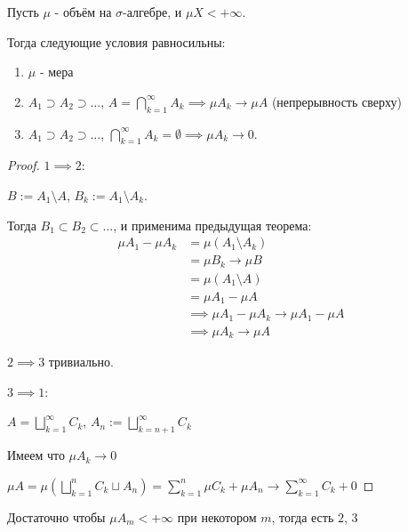 \begin{theorem} \thmslashn

    Пусть $\mu$ - объём на $\sigma$-алгебре, и $\mu X < +\infty$.

    Тогда следующие условия равносильны:
    \begin{enumerate}
        \item $\mu$ - мера
        \item $A_1 \supset A_2 \supset \ldots$, $A = \bigcap\limits_{k=1}^{\infty} A_{k} \implies \mu A_{k} \to \mu A $ (непрерывность сверху)
        \item $A_1 \supset A_2 \supset \ldots$, $\bigcap\limits_{k=1}^{\infty} A_{k} = \emptyset \implies \mu A_{k} \to 0 $.
    \end{enumerate}
    \begin{proof} \thmslashn
    
        $1 \implies 2$:

        $B := A_1 \setminus A$, $B_{k} := A_1 \setminus A_{k}$.

        Тогда $B_1 \subset B_2 \subset \ldots$, и применима предыдущая теорема:
        \begin{equation*}
            \begin{split}
                \mu A_1 - \mu A_{k}
                &= \mu(A_1 \setminus A_{k})\\
                &= \mu B_{k} \to \mu B\\
                &= \mu(A_1 \setminus A)\\
                &= \mu A_1 - \mu A\\
                &\implies \mu A_1 - \mu A_{k} \to \mu A_1 - \mu A\\
                &\implies \mu A_{k} \to \mu A 
            \end{split}
        \end{equation*}

        $2 \implies 3$ тривиально.

        $3 \implies 1$:

        $A = \bigsqcup\limits_{k=1}^{\infty} C_{k}$, $A_{n} := \bigsqcup\limits_{k=n+1}^{\infty} C_{k} $ 

        Имеем что $\mu A_{k} \to 0$

        $\mu A = \mu \left( \bigsqcup\limits_{k=1}^{n} C_{k} \sqcup A_{n} \right) = \sum\limits_{k=1}^{n} \mu C_{k} + \mu A_{n} \to \sum\limits_{k=1}^{\infty} C_{k} + 0 $
    \end{proof}
\end{theorem}
\begin{consequence} \thmslashn

    Достаточно чтобы $\mu A_{m} < +\infty$ при некотором $m$, тогда есть $2$, $3$
\end{consequence}
